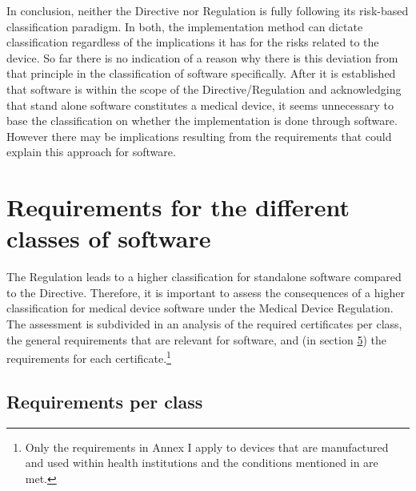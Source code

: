 \documentclass[
]{scrartcl}
\begin{document}
In conclusion, neither the Directive nor Regulation is fully following its risk-based classification paradigm. In both, the implementation method can dictate classification regardless of the implications it has for the risks related to the device. So far there is no indication of a reason why there is this deviation from that principle in the classification of software specifically. After it is established that software is within the scope of the Directive/Regulation and acknowledging that stand alone software constitutes a medical device, it seems unnecessary to base the classification on whether the implementation is done through software. However there may be implications resulting from the requirements that could explain this approach for software.

\hypertarget{requirements-for-the-different-classes-of-software}{%
\section{Requirements for the different classes of software}\label{requirements-for-the-different-classes-of-software}}

The Regulation leads to a higher classification for standalone software compared to the Directive. Therefore, it is important to assess the consequences of a higher classification for medical device software under the Medical Device Regulation. The assessment is subdivided in an analysis of the required certificates per class, the general requirements that are relevant for software, and (in section \protect\hyperlink{sec:Certificates-in-the}{5}) the requirements for each certificate.\footnote{Only the requirements in Annex I apply to devices that are manufactured and used within health institutions and the conditions mentioned in are met.}

\hypertarget{requirements-per-class}{%
\subsection{Requirements per class}\label{requirements-per-class}}
\end{document}
